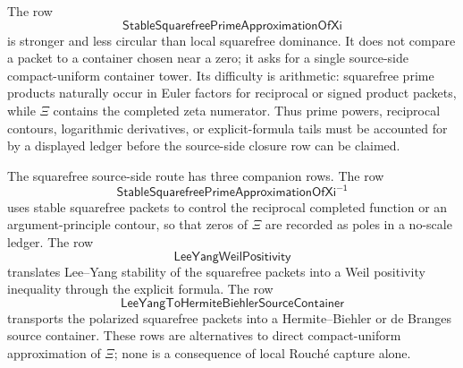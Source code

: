 \begin{principle}
\label{prin:rh-source-side-squarefree-obstruction}
The row
$$
\mathsf{StableSquarefreePrimeApproximationOfXi}
$$
is stronger and less circular than local squarefree dominance.  It does
not compare a packet to a container chosen near a zero; it asks for a
single source-side compact-uniform container tower.  Its difficulty is
arithmetic: squarefree prime products naturally occur in Euler factors
for reciprocal or signed product packets, while $\Xi$ contains the
completed zeta numerator.  Thus prime powers, reciprocal contours,
logarithmic derivatives, or explicit-formula tails must be accounted for
by a displayed ledger before the source-side closure row can be
claimed.
\end{principle}

\begin{definition}
\label{def:rh-squarefree-closure-companion-rows}
The squarefree source-side route has three companion rows.  The row
$$
\mathsf{StableSquarefreePrimeApproximationOfXi^{-1}}
$$
uses stable squarefree packets to control the reciprocal completed
function or an argument-principle contour, so that zeros of $\Xi$ are
recorded as poles in a no-scale ledger.  The row
$$
\mathsf{LeeYangWeilPositivity}
$$
translates Lee--Yang stability of the squarefree packets into a Weil
positivity inequality through the explicit formula.  The row
$$
\mathsf{LeeYangToHermiteBiehlerSourceContainer}
$$
transports the polarized squarefree packets into a Hermite--Biehler or
de Branges source container.  These rows are alternatives to direct
compact-uniform approximation of $\Xi$; none is a consequence of local
Rouch\'e capture alone.
\end{definition}
